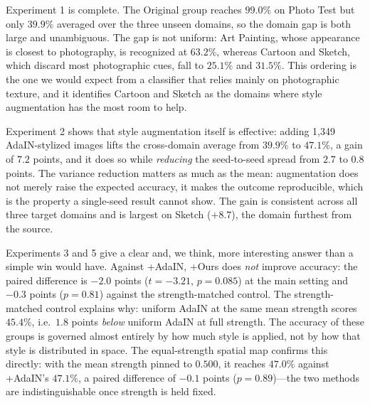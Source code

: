 Experiment 1 is complete. The Original group reaches $99.0\%$ on Photo Test but only $39.9\%$ averaged over the three unseen domains, so the domain gap is both large and unambiguous. The gap is not uniform: Art Painting, whose appearance is closest to photography, is recognized at $63.2\%$, whereas Cartoon and Sketch, which discard most photographic cues, fall to $25.1\%$ and $31.5\%$. This ordering is the one we would expect from a classifier that relies mainly on photographic texture, and it identifies Cartoon and Sketch as the domains where style augmentation has the most room to help.

Experiment 2 shows that style augmentation itself is effective: adding 1{,}349 AdaIN-stylized images lifts the cross-domain average from $39.9\%$ to $47.1\%$, a gain of $7.2$ points, and it does so while \emph{reducing} the seed-to-seed spread from $2.7$ to $0.8$ points. The variance reduction matters as much as the mean: augmentation does not merely raise the expected accuracy, it makes the outcome reproducible, which is the property a single-seed result cannot show. The gain is consistent across all three target domains and is largest on Sketch ($+8.7$), the domain furthest from the source.

Experiments 3 and 5 give a clear and, we think, more interesting answer than a simple win would have. Against +AdaIN, +Ours does \emph{not} improve accuracy: the paired difference is $-2.0$ points ($t=-3.21$, $p=0.085$) at the main setting and $-0.3$ points ($p=0.81$) against the strength-matched control. The strength-matched control explains why: uniform AdaIN at the same mean strength scores $45.4\%$, i.e.\ $1.8$ points \emph{below} uniform AdaIN at full strength. The accuracy of these groups is governed almost entirely by how much style is applied, not by how that style is distributed in space. The equal-strength spatial map confirms this directly: with the mean strength pinned to $0.500$, it reaches $47.0\%$ against +AdaIN's $47.1\%$, a paired difference of $-0.1$ points ($p=0.89$)---the two methods are indistinguishable once strength is held fixed.

